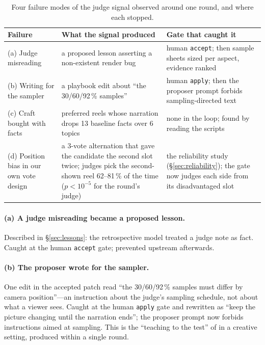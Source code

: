 \documentclass[11pt]{article}
\begin{document}
\begin{table}[t]
\centering\small
\begin{tabular}{p{3.6cm}p{5.7cm}p{5.3cm}}
\toprule
Failure & What the signal produced & Gate that caught it \\
\midrule
(a) Judge misreading & a proposed lesson asserting a non-existent render bug & human \texttt{accept}; then sample sheets sized per aspect, evidence ranked \\
(b) Writing for the sampler & a playbook edit about ``the 30/60/92\,\% samples'' & human \texttt{apply}; then the proposer prompt forbids sampling-directed text \\
(c) Craft bought with facts & preferred reels whose narration drops 13 baseline facts over 6 topics & none in the loop; found by reading the scripts \\
(d) Position bias in our own vote design & a 3-vote alternation that gave the candidate the second slot twice; judges pick the second-shown reel 62--81\,\% of the time ($p<10^{-5}$ for the round's judge) & the reliability study (\S\ref{sec:reliability}); the gate now judges each side from its disadvantaged slot \\
\bottomrule
\end{tabular}
\caption{Four failure modes of the judge signal observed around one round, and where each stopped.}
\label{tab:hacking}
\end{table}

\paragraph{(a) A judge misreading became a proposed lesson.} Described in \S\ref{sec:lessons}: the
retrospective model treated a judge note as fact. Caught at the human \texttt{accept} gate; prevented
upstream afterwards.

\paragraph{(b) The proposer wrote for the sampler.} One edit in the accepted patch read ``the
30/60/92\,\% samples must differ by camera position''---an instruction about the judge's sampling
schedule, not about what a viewer sees. Caught at the human \texttt{apply} gate and rewritten as
``keep the picture changing until the narration ends''; the proposer prompt now forbids instructions
aimed at sampling. This is the ``teaching to the test'' of \citet{notanoracle2026} in a creative
setting, produced within a single round.
\end{document}
